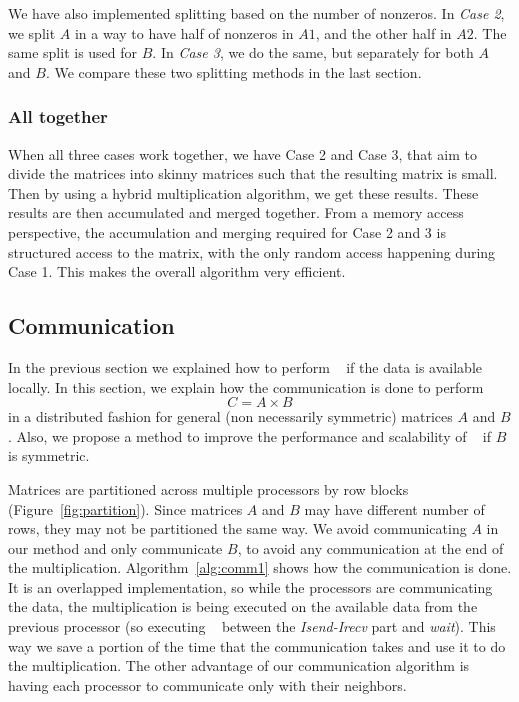 We have also implemented splitting based on the number of nonzeros. In \textit{Case 2}, we split $A$ in a way to have half of nonzeros in $A1$, and the other half in $A2$. The same split is used for $B$. In \textit{Case 3}, we do the same, but separately for both $A$ and $B$. We compare these two splitting methods in the last section.

\subsubsection{All together}

When all three cases work together, we have Case 2 and Case 3, that aim to divide the matrices into skinny matrices such that the resulting matrix is small. Then by using a hybrid multiplication algorithm, we get these results. These results are then accumulated and merged together. From a memory access perspective, the accumulation and merging required for Case 2 and 3 is structured access to the matrix, with the only random access happening during Case 1. This makes the overall algorithm very efficient. 

\subsection{Communication}
\label{sec:amg}

In the previous section we explained how to perform \recmm~ if the data is available locally. In this section, we explain how the communication is done to perform
\begin{equation}
    C = A \times B
\end{equation}
in a distributed fashion for general (non necessarily symmetric) matrices $A$ and $B$. Also, we propose a method to improve the performance and scalability of \recmm~ if $B$ is symmetric.

Matrices are partitioned across multiple processors by row blocks (Figure~\ref{fig:partition}). Since matrices $A$ and $B$ may have different number of rows, they may not be partitioned the same way. We avoid communicating $A$ in our method and only communicate $B$, to avoid any communication at the end of the multiplication. Algorithm~\ref{alg:comm1} shows how the communication is done. It is an overlapped implementation, so while the processors are communicating the data, the multiplication is being executed on the available data from the previous processor (so executing \recmm~ between the \textit{Isend-Irecv} part and \textit{wait}). This way we save a portion of the time that the communication takes and use it to do the multiplication. The other advantage of our communication algorithm is having each processor to communicate only with their neighbors.

